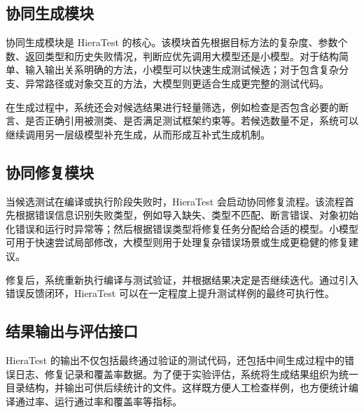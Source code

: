 \subsection{协同生成模块}

协同生成模块是 HieraTest 的核心。该模块首先根据目标方法的复杂度、参数个数、返回类型和历史失败情况，判断应优先调用大模型还是小模型。对于结构简单、输入输出关系明确的方法，小模型可以快速生成测试候选；对于包含复杂分支、异常路径或对象交互的方法，大模型则更适合生成更完整的测试代码。

在生成过程中，系统还会对候选结果进行轻量筛选，例如检查是否包含必要的断言、是否正确引用被测类、是否满足测试框架约束等。若候选数量不足，系统可以继续调用另一层级模型补充生成，从而形成互补式生成机制。

\subsection{协同修复模块}

当候选测试在编译或执行阶段失败时，HieraTest 会启动协同修复流程。该流程首先根据错误信息识别失败类型，例如导入缺失、类型不匹配、断言错误、对象初始化错误和运行时异常等；然后根据错误类型将修复任务分配给合适的模型。小模型可用于快速尝试局部修改，大模型则用于处理复杂错误场景或生成更稳健的修复建议。

修复后，系统重新执行编译与测试验证，并根据结果决定是否继续迭代。通过引入错误反馈闭环，HieraTest 可以在一定程度上提升测试样例的最终可执行性。

\subsection{结果输出与评估接口}

HieraTest 的输出不仅包括最终通过验证的测试代码，还包括中间生成过程中的错误日志、修复记录和覆盖率数据。为了便于实验评估，系统将生成结果组织为统一目录结构，并输出可供后续统计的文件。这样既方便人工检查样例，也方便统计编译通过率、运行通过率和覆盖率等指标。
